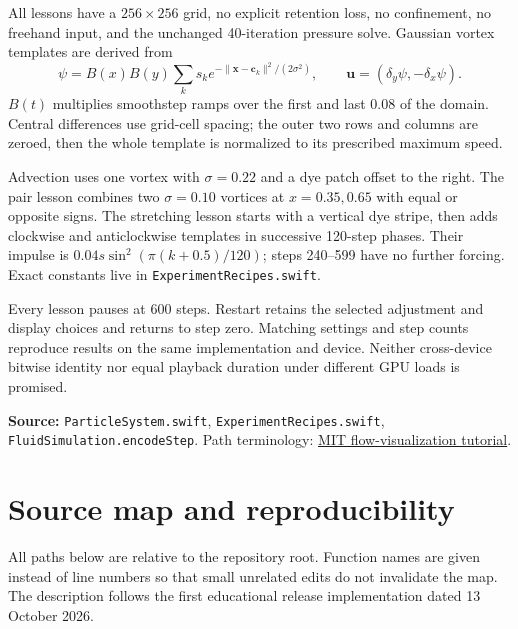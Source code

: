 \documentclass[11pt,a4paper]{article}
\newcommand{\uvec}{\mathbf{u}}
\newcommand{\src}[1]{\par{\footnotesize\raggedright\color{teal}\textbf{Source:} #1\par}}
\newcommand{\code}[1]{\texttt{#1}}
\newcommand{\page}[1]{\clearpage\section{#1}}
\begin{document}
All lessons have a $256\times256$ grid, no explicit retention loss, no confinement, no freehand input, and the unchanged 40-iteration pressure solve. Gaussian vortex templates are derived from
\begin{equation}
 \psi=B(x)B(y)\sum_k s_k e^{-\|\mathbf x-\mathbf c_k\|^2/(2\sigma^2)},\qquad
 \uvec=(\delta_y\psi,-\delta_x\psi).
\end{equation}
$B(t)$ multiplies smoothstep ramps over the first and last $0.08$ of the domain. Central differences use grid-cell spacing; the outer two rows and columns are zeroed, then the whole template is normalized to its prescribed maximum speed.

Advection uses one vortex with $\sigma=0.22$ and a dye patch offset to the right. The pair lesson combines two $\sigma=0.10$ vortices at $x=0.35,0.65$ with equal or opposite signs. The stretching lesson starts with a vertical dye stripe, then adds clockwise and anticlockwise templates in successive 120-step phases. Their impulse is $0.04s\sin^2(\pi(k+0.5)/120)$; steps 240--599 have no further forcing. Exact constants live in \code{ExperimentRecipes.swift}.

Every lesson pauses at 600 steps. Restart retains the selected adjustment and display choices and returns to step zero. Matching settings and step counts reproduce results on the same implementation and device. Neither cross-device bitwise identity nor equal playback duration under different GPU loads is promised.
\src{\code{ParticleSystem.swift}, \code{ExperimentRecipes.swift}, \code{FluidSimulation.encodeStep}. Path terminology: \href{https://web.mit.edu/fluids-modules/www/potential_flows/LecturesHTML/lec02/tutorial/}{MIT flow-visualization tutorial}.}

\page{Source map and reproducibility}
All paths below are relative to the repository root. Function names are given
instead of line numbers so that small unrelated edits do not invalidate the map.
The description follows the first educational release implementation dated 13 October 2026.
\end{document}
